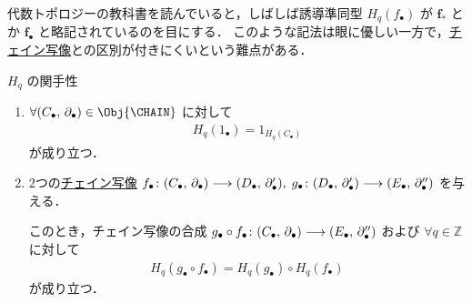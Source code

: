 \documentclass[algtopo_main]{subfiles}
\begin{document}
\begin{marker}
    代数トポロジーの教科書を読んでいると，しばしば誘導準同型 $H_q(f_\bullet)$ が $\bm{f_*}$ とか $\bm{f_\bullet}$ と略記されているのを目にする．
    このような記法は眼に優しい一方で，\hyperref[def:chainmap]{チェイン写像}との区別が付きにくいという難点がある．
\end{marker}

\begin{myprop}[label=prop:Hq-functoriality]{$H_q$ の関手性}
    \begin{enumerate}
        \item $\forall (C_\bullet,\, \partial_\bullet) \in \Obj{\CHAIN}$ に対して
        \begin{align}
            H_q(1_\bullet) = 1_{H_q(C_\bullet)}
        \end{align}
        が成り立つ．
        \item 
        2つの\hyperref[def:chainmap]{チェイン写像} $f_\bullet \colon (C_\bullet,\, \partial_\bullet) \longrightarrow (D_\bullet,\, \partial'_\bullet),\; g_\bullet \colon (D_\bullet,\, \partial'_\bullet) \longrightarrow (E_\bullet,\, \partial''_\bullet)$ を与える．
        
        このとき，チェイン写像の合成
        $g_\bullet \circ f_\bullet \colon (C_\bullet,\, \partial_\bullet) \longrightarrow (E_\bullet,\, \partial''_\bullet)$
        および $\forall q \in \mathbb{Z}$ に対して
        \begin{align}
            H_q (g_\bullet \circ f_\bullet) = H_q(g_\bullet) \circ H_q(f_\bullet)
        \end{align}
        が成り立つ．
    \end{enumerate}
\end{myprop}
\end{document}
